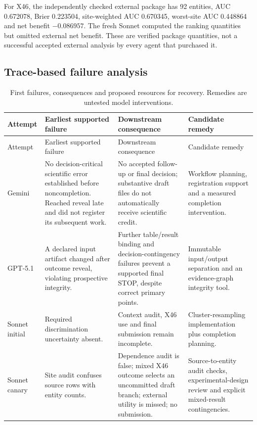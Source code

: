 \documentclass[11pt,a4paper]{article}
\begin{document}
For X46, the independently checked external package has 92 entities, AUC 0.672078, Brier 0.223504, site-weighted AUC 0.670345, worst-site AUC 0.448864 and net benefit $-0.086957$. The fresh Sonnet computed the ranking quantities but omitted external net benefit. These are verified package quantities, not a successful accepted external analysis by every agent that purchased it.

\subsection{Trace-based failure analysis}

\begin{longtable}{@{}p{}p{}p{}p{}@{}}
\caption{First failures, consequences and proposed resources for recovery. Remedies are untested model interventions.}\\
\toprule Attempt & Earliest supported failure & Downstream consequence & Candidate remedy \\\midrule\endfirsthead
\toprule Attempt & Earliest supported failure & Downstream consequence & Candidate remedy \\\midrule\endhead
Gemini & No decision-critical scientific error established before noncompletion. Reached reveal late and did not register its subsequent work. & No accepted follow-up or final decision; substantive draft files do not automatically receive scientific credit. & Workflow planning, registration support and a measured completion intervention. \\
GPT-5.1 & A declared input artifact changed after outcome reveal, violating prospective integrity. & Further table/result binding and decision-contingency failures prevent a supported final STOP, despite correct primary points. & Immutable input/output separation and an evidence-graph integrity tool. \\
Sonnet initial & Required discrimination uncertainty absent. & Context audit, X46 use and final submission remain incomplete. & Cluster-resampling implementation plus completion planning. \\
Sonnet canary & Site audit confuses source rows with entity counts. & Dependence audit is false; mixed X46 outcome selects an uncommitted draft branch; external utility is missed; no submission. & Source-to-entity audit checks, experimental-design review and explicit mixed-result contingencies. \\\bottomrule
\end{longtable}
\end{document}
